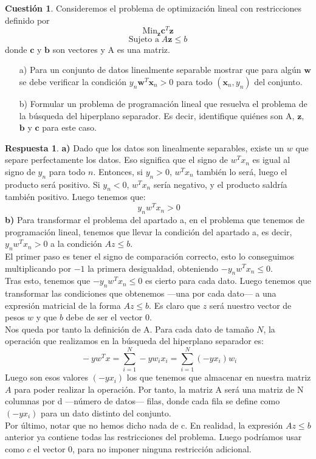 \documentclass[10pt,a4paper]{article}
\theoremstyle{definition}
\newtheorem{cuestion}{Cuestión}
\newtheorem*{respuesta}{Respuesta}
\begin{document}
\begin{cuestion}
Consideremos el problema de optimización lineal con restricciones definido por 
\[	\textrm{Min}_{\mathbf{z}}\mathbf{c}^T\mathbf{z}	\]
\[	\textrm{Sujeto a}\; A\mathbf{z} \leq b	\]
donde $\mathbf{c}$ y $\mathbf{b}$ son vectores y A es una matriz.
\begin{enumerate}
\item[a)] Para un conjunto de datos linealmente separable mostrar que para algún $\mathbf{w}$ se debe verificar la condición $y_n\mathbf{w}^T\mathbf{x}_n > 0$ para todo $(\mathbf{x}_n, y_n)$ del conjunto.
\item[b)] Formular un problema de programación lineal que resuelva el problema de la búsqueda del hiperplano separador. Es decir, identifique quiénes son A, $\mathbf{z}$, $\mathbf{b}$ y $\mathbf{c}$ para este caso.
\end{enumerate}
\end{cuestion}
\begin{respuesta}
\textbf{a)} Dado que los datos son linealmente separables, existe un $w$ que separe perfectamente los datos. Eso significa que el signo de $w^Tx_n$ es igual al signo de $y_n$ para todo $n$. Entonces, si $y_n>0$, $w^Tx_n$ también lo será, luego el producto será positivo. Si $y_n<0$, $w^Tx_n$ sería negativo, y el producto saldría también positivo. Luego tenemos que:
\[
\ y_nw^Tx_n > 0
\]
\textbf{b)} Para transformar el problema del apartado a, en el problema que tenemos de programación lineal, tenemos que llevar la condición del apartado a, es decir, $y_nw^Tx_n > 0$ a la condición $Az \leq b$.\\

El primer paso es tener el signo de comparación correcto, esto lo conseguimos multiplicando por $-1$ la primera desigualdad, obteniendo $-y_nw^Tx_n \leq 0$.\\

Tras esto, tenemos que $-y_nw^Tx_n \leq 0$ es cierto para cada dato. Luego tenemos que transformar las condiciones que obtenemos ---una por cada dato--- a una expresión matricial de la forma $Az \leq b$. Es claro que $z$ será nuestro vector de pesos $w$ y que $b$ debe de ser el vector 0.\\

Nos queda por tanto la definición de A. Para cada dato de tamaño $N$, la operación que realizamos en la búsqueda del hiperplano separador es:
\[
\ -yw^Tx = \sum_{i=1}^{N}-yw_ix_i = \sum_{i=1}^{N}(-yx_i)w_i
\]
Luego son esos valores $(-yx_i)$ los que tenemos que almacenar en nuestra matriz $A$ para poder realizar la operación. Por tanto, la matriz A será una matriz de N columnas por d ---número de datos--- filas, donde cada fila se define como $(-yx_i)$ para un dato distinto del conjunto.\\
 
Por último, notar que no hemos dicho nada de c. En realidad, la expresión $Az \leq b$ anterior ya contiene todas las restricciones del problema. Luego podríamos usar como $c$ el vector 0, para no imponer ninguna restricción adicional.
\end{respuesta}
\end{document}
